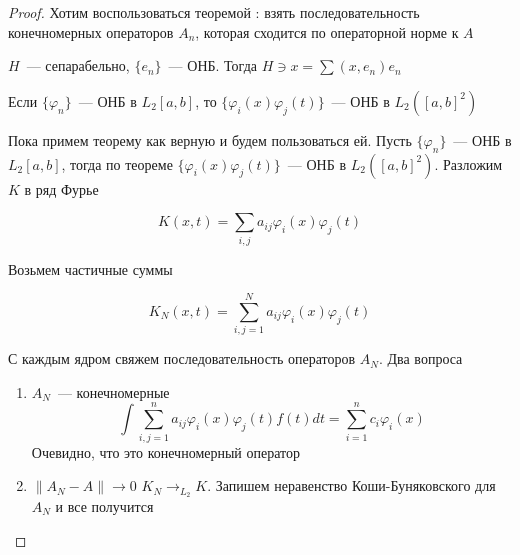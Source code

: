 \begin{proof}
    Хотим воспользоваться теоремой : взять последовательность конечномерных операторов $A_n$, которая сходится по операторной норме к $A$

    $H$~--- сепарабельно, $\{ e_n \}$~--- ОНБ. Тогда $H \ni x = \sum (x, e_n) e_n$

    \begin{theorem}
        Если $\{ \varphi_n \}$~--- ОНБ в $L_2[a,b]$, то $\{ \varphi_i(x)\varphi_j(t) \}$~--- ОНБ в $L_2([a,b]^2)$
    \end{theorem}
    
    Пока примем теорему как верную и будем пользоваться ей. Пусть $\{ \varphi_n \}$~--- ОНБ в $L_2[a,b]$, тогда по теореме $\{ \varphi_i(x) \varphi_j(t) \}$~--- ОНБ в $L_2([a,b]^2)$. Разложим $K$ в ряд Фурье

    \[ K(x,t) = \sum_{i,j} a_{ij} \varphi_i(x) \varphi_j(t) \]

    Возьмем частичные суммы

    \[ K_N(x,t) = \sum_{i,j=1}^N a_{ij} \varphi_i(x) \varphi_j(t) \]

    С каждым ядром свяжем последовательность операторов $A_N$. 
    Два вопроса
    \begin{enumerate}
        \item $A_N$~--- конечномерные
        \[ \int \sum_{i,j=1}^n a_{ij} \varphi_i(x) \varphi_j(t) f(t) dt = \sum_{i=1}^n c_i \varphi_i(x)\]
        Очевидно, что это конечномерный оператор
        \item $\| A_N - A \| \to 0$
        $K_N \to_{L_2} K$. Запишем неравенство Коши-Буняковского для $A_N$ и все получится
    \end{enumerate}
\end{proof}
